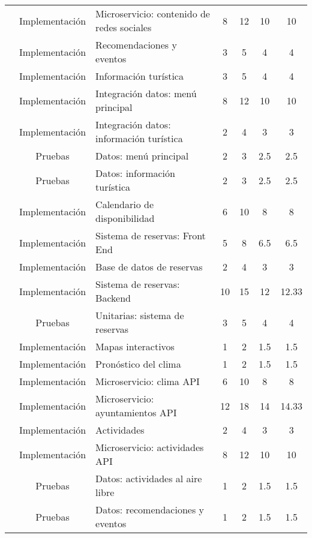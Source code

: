 \begin{table}[h!tb]
\begin{adjustbox}{width=0.98\textwidth}
\begin{scriptsize}
\begin{tabular}{|c|c|L|c|c|c|c|}
     & Implementación & Microservicio: contenido de redes sociales & 8 & 12 & 10 & 10 \\ 
    & Implementación & Recomendaciones y eventos & 3 & 5 & 4 & 4 \\ 
    & Implementación & Información turística & 3 & 5 & 4 & 4 \\ 
    & Implementación & Integración datos: menú principal & 8 & 12 & 10 & 10 \\ 
    & Implementación & Integración datos: información turística & 2 & 4 & 3 & 3 \\ 
    & Pruebas & Datos: menú principal & 2 & 3 & 2.5 & 2.5 \\ 
    & Pruebas & Datos: información turística & 2 & 3 & 2.5 & 2.5 \\ \hline

     & Implementación & Calendario de disponibilidad & 6 & 10 & 8 & 8 \\ 
    & Implementación & Sistema de reservas: Front End & 5 & 8 & 6.5 & 6.5 \\ 
    & Implementación & Base de datos de reservas & 2 & 4 & 3 & 3 \\ 
    & Implementación & Sistema de reservas: Backend & 10 & 15 & 12 & 12.33 \\ 
    & Pruebas & Unitarias: sistema de reservas & 3 & 5 & 4 & 4 \\ 
    & Implementación & Mapas interactivos & 1 & 2 & 1.5 & 1.5 \\ 
    & Implementación & Pronóstico del clima & 1 & 2 & 1.5 & 1.5 \\ \hline

     & Implementación & Microservicio: clima API & 6 & 10 & 8 & 8 \\ 
    & Implementación & Microservicio: ayuntamientos API & 12 & 18 & 14 & 14.33 \\ 
    & Implementación & Actividades & 2 & 4 & 3 & 3 \\ 
    & Implementación & Microservicio: actividades API & 8 & 12 & 10 & 10 \\ 
    & Pruebas & Datos: actividades al aire libre & 1 & 2 & 1.5 & 1.5 \\ 
    & Pruebas & Datos: recomendaciones y eventos & 1 & 2 & 1.5 & 1.5 \\ \hline


\end{tabular}
\end{scriptsize}
\end{adjustbox}
\end{table}
